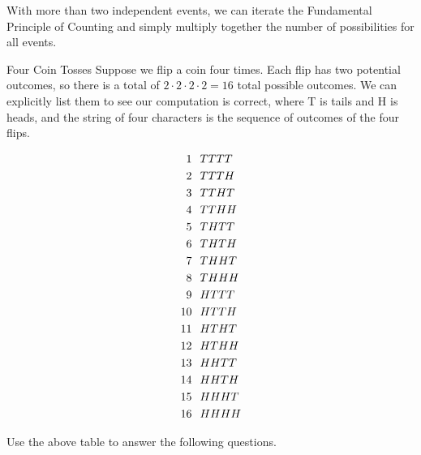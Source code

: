 With more than two independent events, we can iterate the Fundamental Principle of Counting and simply multiply together the number of possibilities for all events.  
\begin{example}{Four Coin Tosses}
Suppose we flip a coin four times.  Each flip has two potential outcomes, so there is a total of $2\cdot 2\cdot 2\cdot 2=16$ total possible outcomes.  We can explicitly list them to see our computation is correct, where T is tails and H is heads, and the string of four characters is the sequence of outcomes of the four flips.

 \begin{align*}
 1\hspace{,1in}  &TTTT \\
 2\hspace{,1in}  &TTTH \\
 3\hspace{,1in}  &TTHT \\
 4\hspace{,1in}  &TTHH \\
 5\hspace{,1in}  &THTT \\
 6\hspace{,1in}  &THTH \\
 7\hspace{,1in}  &THHT \\
 8\hspace{,1in}  &THHH \\
 9\hspace{,1in}  &HTTT \\
 10\hspace{,1in} &HTTH \\
 11\hspace{,1in} &HTHT \\
 12\hspace{,1in} &HTHH \\
 13\hspace{,1in} &HHTT \\
 14\hspace{,1in} &HHTH \\
 15\hspace{,1in} &HHHT \\
 16\hspace{,1in} &HHHH
\end{align*}

\end{example}

Use the above table to answer the following questions.

